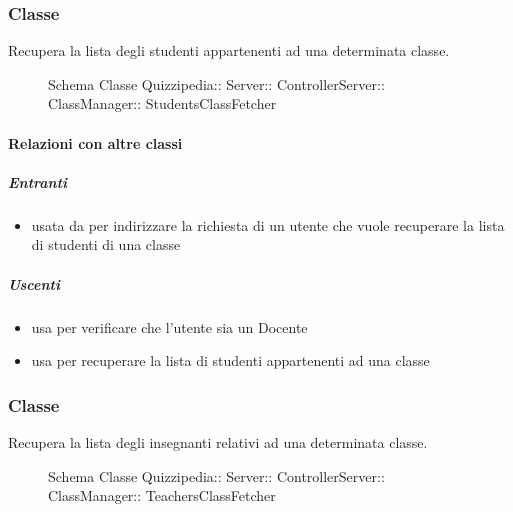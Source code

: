 \subsubsection{Classe }
Recupera la lista degli studenti appartenenti ad una determinata classe.
\begin{figure}[H]
\centering
\noindent{}
\caption[Schema Classe StudentsClassFetcher]{Schema Classe Quizzipedia:: Server:: ControllerServer:: ClassManager:: StudentsClassFetcher}
\end{figure}
\paragraph{Relazioni con altre classi}
\subparagraph{Entranti}
\begin{itemize}
\item usata da  per indirizzare la richiesta di un utente che vuole recuperare la lista di studenti di una classe
\end{itemize}
\subparagraph{Uscenti}
\begin{itemize}
\item usa  per verificare che l'utente sia un Docente
\item usa  per recuperare la lista di studenti appartenenti ad una classe
\end{itemize}
\subsubsection{Classe }
Recupera la lista degli insegnanti relativi ad una determinata classe.
\begin{figure}[H]
\centering
\noindent{}
\caption[Schema Classe TeachersClassFetcher]{Schema Classe Quizzipedia:: Server:: ControllerServer:: ClassManager:: TeachersClassFetcher}
\end{figure}
